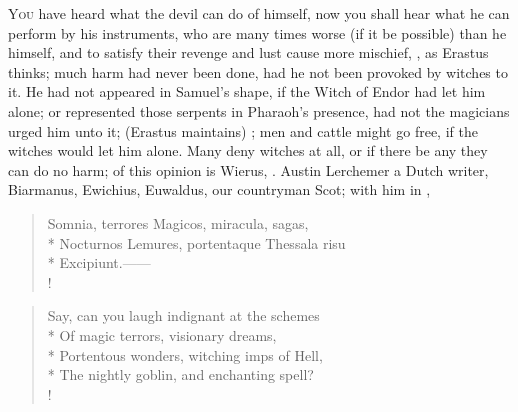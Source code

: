 \lettrine{Y}{ou} have heard what the devil can do of himself, now you shall
hear what he can perform by his instruments, who are many times worse (if it be
possible) than he himself, and to satisfy their revenge and lust cause more
mischief, , as
Erastus thinks; much harm had never been done, had he not
been provoked by witches to it. He had not appeared in Samuel's shape, if the
Witch of Endor had let him alone; or represented those serpents in Pharaoh's
presence, had not the magicians urged him unto it;  (Erastus maintains) ; men and cattle might go free, if the witches would let him alone.
Many deny witches at all, or if there be any they can do no harm; of this
opinion is Wierus, .
Austin Lerchemer a Dutch writer, Biarmanus, Ewichius, Euwaldus, our countryman
Scot; with him in \Horace{},

\begin{latin}
\begin{verse}
Somnia, terrores Magicos, miracula, sagas,\\*
Nocturnos Lemures, portentaque Thessala risu\\*
Excipiunt.------\\!
\end{verse}
\end{latin}

\begin{verse}
Say, can you laugh indignant at the schemes\\*
Of magic terrors, visionary dreams,\\*
Portentous wonders, witching imps of Hell,\\*
The nightly goblin, and enchanting spell?\\!
\end{verse}

